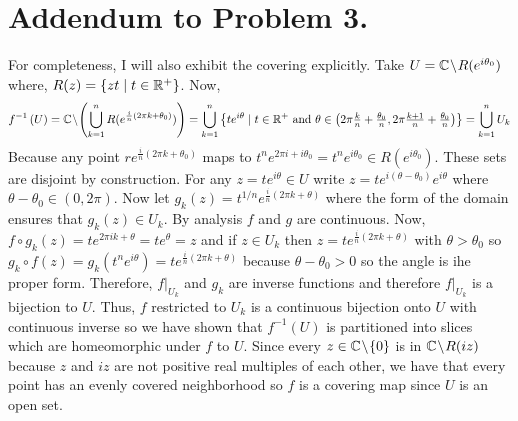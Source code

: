 \documentclass[12pt]{extarticle}
\theoremstyle{remark}
\begin{document}
\section*{Addendum to Problem 3.}
For completeness, I will also exhibit the covering explicitly. Take $U = \mathbb{C} \! \setminus \! R(e^{i\theta_0})$ where, $R(z) = \{zt \mid t \in \mathbb{R}^+\}$. Now, 
\[f^{-1} \left( U \right) = \mathbb{C} \! \setminus \! \left( \bigcup_{k = 1}^n R(e^{\frac{i}{n}(2 \pi k + \theta_0)}) \right) = \bigcup_{k = 1}^n \left\{ t e^{i \theta} \mid t \in \mathbb{R}^+ \text{ and } \theta \in \left(2 \pi \tfrac{k}{n} + \tfrac{\theta_0}{n}, 2 \pi \tfrac{k + 1}{n} + \tfrac{\theta_0}{n} \right) \right\} = \bigcup_{k = 1}^n U_k  \]
Because any point $r e^{\frac{i}{n}(2 \pi k + \theta_0)}$ maps to $t^n e^{2 \pi i + i \theta_0} = t^n e^{i \theta_0} \in R(e^{i \theta_0})$. These sets are disjoint by construction. For any $z = t e^{i \theta} \in U$ write $z = t e^{i (\theta - \theta_0)} e^{i \theta}$ where $\theta - \theta_0 \in (0, 2\pi)$. Now let $g_k(z) = t^{1/n} e^{\frac{i}{n}(2 \pi k + \theta)}$ where the form of the domain ensures that $g_k(z) \in U_k$. By analysis $f$ and $g$ are continuous. Now, $f \circ g_k(z) = t e^{2 \pi i k + \theta} = t e^{\theta} = z$ and if $z \in U_k$ then $z = t e^{\frac{i}{n}(2 \pi k + \theta)}$ with $\theta > \theta_0$ so $g_k \circ f(z) = g_k(t^n e^{i \theta}) = t e^{\frac{i}{n}(2 \pi k + \theta)}$ because $\theta - \theta_0 > 0$ so the angle is ihe proper form. Therefore, $f|_{U_k}$ and $g_k$ are inverse functions and therefore $f|_{U_k}$ is a bijection to $U$. Thus, $f$ restricted to $U_k$ is a continuous bijection onto $U$ with continuous inverse so we have shown that $f^{-1}(U)$ is partitioned into slices which are homeomorphic under $f$ to $U$. Since every $z \in \mathbb{C} \! \setminus \! \{0\}$ is in $\mathbb{C} \! \setminus \! R(i z)$ because $z$ and $iz$ are not positive real multiples of each other, we have that every point has an evenly covered neighborhood so $f$ is a covering map since $U$ is an open set.  
\end{document}
